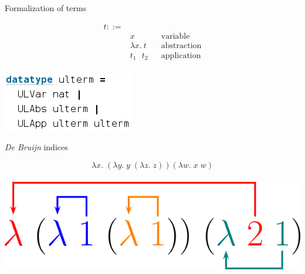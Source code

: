 \documentclass[xcolor=dvipsnames]{beamer}
\begin{document}
\begin{frame}{Formalization of terms}
  \begin{center}
    \small
    \begin{align*}
      t ::= & \\
        & x && \text{variable} \\
        & \lambda x. \ t && \text{abstraction} \\
        & t_1 \text{ } t_2 && \text{application}
    \end{align*}\\
    \vspace{20pt}
    \includegraphics[scale=0.4]{term.png}
  \end{center}
\end{frame}

\begin{frame}{\emph{De Bruijn} indices}
  \begin{center}
    \Large
    \begin{displaymath}
      \lambda x. \; (\lambda y. \; y \; (\lambda z. \; z)) (\lambda w. \; x \; w)
    \end{displaymath} \\
    \vspace{20pt}
    \includegraphics[scale=1]{de_bruijn.png}
  \end{center}
\end{frame}
\end{document}
